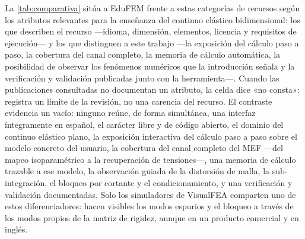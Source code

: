 La \autoref{tab:comparativa} sitúa a EduFEM frente a estas categorías de recursos según los atributos relevantes para la enseñanza del continuo elástico bidimensional: los que describen el recurso —idioma, dimensión, elementos, licencia y requisitos de ejecución— y los que distinguen a este trabajo —la exposición del cálculo paso a paso, la cobertura del canal completo, la memoria de cálculo automática, la posibilidad de observar los fenómenos numéricos que la introducción señala y la verificación y validación publicadas junto con la herramienta—. Cuando las publicaciones consultadas no documentan un atributo, la celda dice «no consta»: registra un límite de la revisión, no una carencia del recurso. El contraste evidencia un vacío: ninguno reúne, de forma simultánea, una interfaz íntegramente en español, el carácter libre y de código abierto, el dominio del continuo elástico plano, la exposición interactiva del cálculo paso a paso sobre el modelo concreto del usuario, la cobertura del canal completo del MEF —del mapeo isoparamétrico a la recuperación de tensiones—, una memoria de cálculo trazable a ese modelo, la observación guiada de la distorsión de malla, la sub-integración, el bloqueo por cortante y el condicionamiento, y una verificación y validación documentadas. Solo los simuladores de VisualFEA comparten uno de estos diferenciadores: hacen visibles los modos espurios y el bloqueo a través de los modos propios de la matriz de rigidez, aunque en un producto comercial y en inglés.

